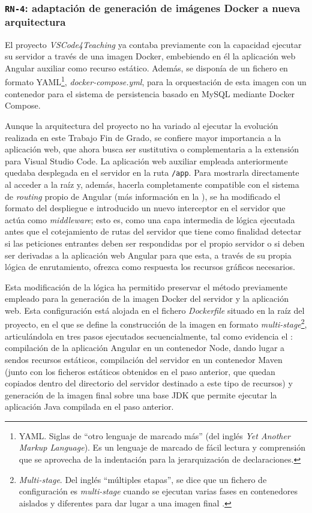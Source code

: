 \subsubsection{\texttt{RN-4}: adaptación de generación de imágenes Docker a nueva arquitectura}
\label{subsec:rn4}

El proyecto \textit{VSCode4Teaching} ya contaba previamente con la capacidad ejecutar su servidor a través de una imagen Docker, embebiendo en él la aplicación web Angular auxiliar como recurso estático. Además, se disponía de un fichero en formato YAML\footnote{YAML. Siglas de ``otro lenguaje de marcado más'' (del inglés \textit{Yet Another Markup Language}). Es un lenguaje de marcado de fácil lectura y comprensión que se aprovecha de la indentación para la jerarquización de declaraciones.}, \textit{docker-compose.yml}, para la orquestación de esta imagen con un contenedor para el sistema de persistencia basado en MySQL mediante Docker Compose.

Aunque la arquitectura del proyecto no ha variado al ejecutar la evolución realizada en este Trabajo Fin de Grado, se confiere mayor importancia a la aplicación web, que ahora busca ser sustitutiva o complementaria a la extensión para Visual Studio Code. La aplicación web auxiliar empleada anteriormente quedaba desplegada en el servidor en la ruta \texttt{/app}. Para mostrarla directamente al acceder a la raíz y, además, hacerla completamente compatible con el sistema de \textit{routing} propio de Angular (más información en la ), se ha modificado el formato del despliegue e introducido un nuevo interceptor en el servidor que actúa como \textit{middleware}; esto es, como una capa intermedia de lógica ejecutada antes que el cotejamiento de rutas del servidor que tiene como finalidad detectar si las peticiones entrantes deben ser respondidas por el propio servidor o si deben ser derivadas a la aplicación web Angular para que esta, a través de su propia lógica de enrutamiento, ofrezca como respuesta los recursos gráficos necesarios.

Esta modificación de la lógica ha permitido preservar el método previamente empleado para la generación de la imagen Docker del servidor y la aplicación web. Esta configuración está alojada en el fichero \textit{Dockerfile} situado en la raíz del proyecto, en el que se define la construcción de la imagen en formato \textit{multi-stage}\footnote{\textit{Multi-stage}. Del inglés ``múltiples etapas'', se dice que un fichero de configuración es \textit{multi-stage} cuando se ejecutan varias fases en contenedores aislados y diferentes para dar lugar a una imagen final \cite{DockerfileMultistage}.}, articulándola en tres pasos ejecutados secuencialmente, tal como evidencia el : compilación de la aplicación Angular en un contenedor Node, dando lugar a sendos recursos estáticos, compilación del servidor en un contenedor Maven (junto con los ficheros estáticos obtenidos en el paso anterior, que quedan copiados dentro del directorio del servidor destinado a este tipo de recursos) y generación de la imagen final sobre una base JDK que permite ejecutar la aplicación Java compilada en el paso anterior.

